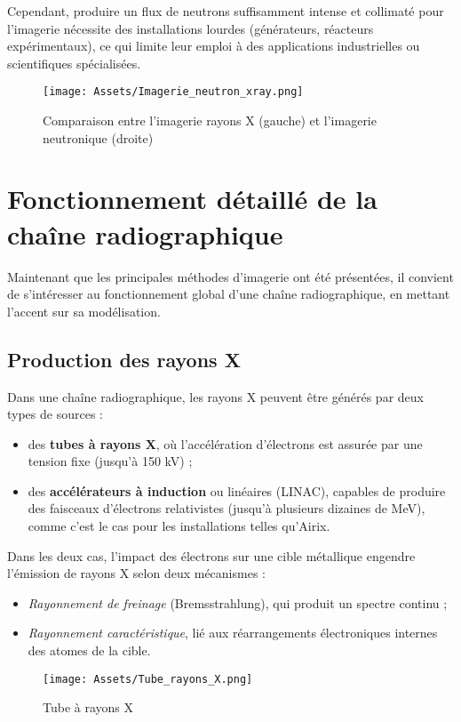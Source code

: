 \documentclass[12pt,a4paper]{report}
\begin{document}
Cependant, produire un flux de neutrons suffisamment intense et collimaté pour l’imagerie nécessite des installations lourdes (générateurs, réacteurs expérimentaux), ce qui limite leur emploi à des applications industrielles ou scientifiques spécialisées.
\begin{figure}[H]
    \centering
    \texttt{[image: Assets/Imagerie\_neutron\_xray.png]}
    \caption{Comparaison entre l'imagerie rayons X (gauche) et l'imagerie neutronique (droite)}
    \label{fig:images}
\end{figure}

\section{Fonctionnement détaillé de la chaîne radiographique}
Maintenant que les principales méthodes d’imagerie ont été présentées, il convient de s’intéresser au fonctionnement global d’une chaîne radiographique, en mettant l’accent sur sa modélisation.

\subsection{Production des rayons X}
Dans une chaîne radiographique, les rayons X peuvent être générés par deux types de sources :
\begin{itemize}
\item des \textbf{tubes à rayons X}, où l’accélération d’électrons est assurée par une tension fixe (jusqu’à 150 kV) ;
\item des \textbf{accélérateurs à induction} ou linéaires (LINAC), capables de produire des faisceaux d’électrons relativistes (jusqu’à plusieurs dizaines de MeV), comme c’est le cas pour les installations telles qu’Airix.
\end{itemize}
Dans les deux cas, l’impact des électrons sur une cible métallique engendre l’émission de rayons X selon deux mécanismes :
\begin{itemize}
\item \textit{Rayonnement de freinage} (Bremsstrahlung), qui produit un spectre continu ;
\item \textit{Rayonnement caractéristique}, lié aux réarrangements électroniques internes des atomes de la cible.
\end{itemize}
\begin{figure}[H]
    \centering
    \texttt{[image: Assets/Tube\_rayons\_X.png]}
    \caption{Tube à rayons X}
    \label{fig:images}
\end{figure}
\end{document}
